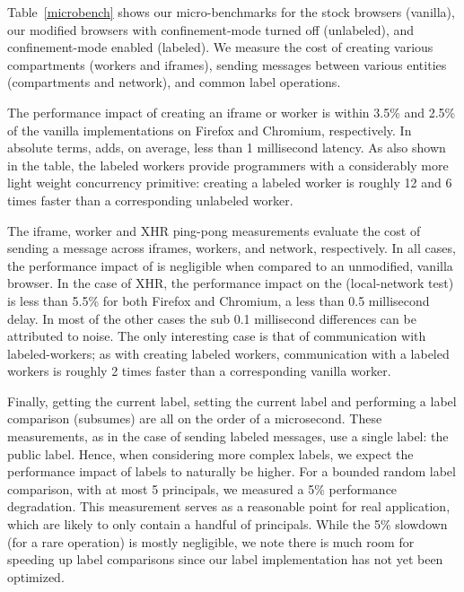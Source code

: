 Table~\ref{microbench} shows our micro-benchmarks for the stock
browsers (vanilla), our modified browsers with confinement-mode turned
off (unlabeled), and confinement-mode enabled (labeled).
%
We measure the cost of creating various compartments (workers and
iframes), sending messages between various entities
(compartments and network), and common label operations.

The performance impact of creating an iframe or worker is
within 3.5\% and 2.5\% of the vanilla implementations on Firefox and
Chromium, respectively.
%
In absolute terms, \sys{} adds, on average, less than 1 millisecond
latency.
%
As also shown in the table, the \sys{} labeled workers provide
programmers with a considerably more light weight concurrency
primitive: creating a labeled worker is roughly 12 and 6 times faster
than a corresponding unlabeled worker.

%
The iframe, worker and XHR ping-pong measurements evaluate the cost of 
sending a message across iframes, workers, and network, respectively.
%
In all cases, the performance impact of \sys{} is negligible when
compared to an unmodified, vanilla browser.
%
In the case of XHR, the performance impact on the
(local-network test) is less than 5.5\% for both Firefox and Chromium,
a less than 0.5 millisecond delay.
%
In most of the other cases the sub 0.1 millisecond differences can be
attributed to noise.
%
The only interesting case is that of communication with
labeled-workers; as with creating labeled workers, communication with
a labeled workers is roughly 2 times faster than a corresponding
vanilla worker.

Finally, getting the current label, setting the current label and
performing a label comparison (subsumes) are all on the order of a
microsecond.
%
These measurements, as in the case of sending labeled messages, use
a single label: the public label.
%
Hence, when considering more complex labels, we expect the performance
impact of labels to naturally be higher.
%
For a bounded random label comparison, with at most 5 principals, we
measured a 5\% performance degradation.
%
This measurement serves as a reasonable point for real application,
which are likely to only contain a handful of principals.
%
While the 5\% slowdown (for a rare operation) is mostly negligible, we
note there is much room for speeding up label comparisons since our
label implementation has not yet been optimized.


